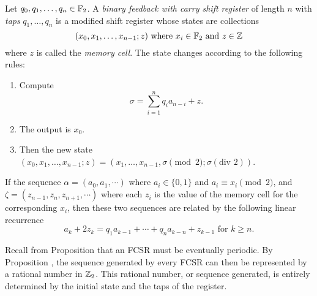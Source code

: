 \begin{definition}\label{def:fcsr}
  Let $q_0,q_1,\dots,q_n\in\mathbb{F}_2$. A {\em binary feedback with carry shift register} 
  of length $n$ with {\em taps} $q_1,\dots,q_n$ is a modified shift register
  whose states are collections
  \[
	(x_0,x_1,\dots,x_{n-1};z) \text{ where } x_i\in\mathbb{F}_2 \text{ and } z \in \mathbb{Z}
  \]
  where $z$ is called the {\it memory cell}. The state changes according
  to the following rules:
  \begin{enumerate}[1.]
    \item Compute
      \[
      \sigma = \sum^n_{i=1}q_ia_{n-i}+z.
      \]
    \item The output is $x_0$.
    \item Then the new state $(x_0,x_1,\dots,x_{n-1};z)
      =(x_1,\dots,x_{n-1},\sigma\pmod2;\sigma(\text{div }2))$.
  \end{enumerate}
\end{definition}

\begin{lemma}\label{lem:linear-recur}
\par If the sequence $\alpha=(a_0,a_1,\cdots)$ where $a_i\in\{0,1\}$ and
$a_i\equiv x_i\pmod2$, and $\zeta=(z_{n-1},z_n,z_{n+1},\cdots)$ where each
$z_i$ is the value of the memory cell for the corresponding $x_i$, then
these two sequences are related by the following linear recurrence
\begin{equation}\label{eqn:lin-rec}
  a_k+2z_k=q_1a_{k-1}+\cdots+q_na_{k-n}+z_{k-1} \text{ for } k\geq n.
\end{equation}
\end{lemma}

\par Recall from Proposition \label{prop:golomb-2} that an FCSR must be
eventually periodic. By Proposition \label{prop:rational-periodic}, the sequence
generated by every FCSR can then be represented by a rational number in
$\mathbb{Z}_2$. This rational number, or sequence generated, is entirely determined by
the initial state and the taps of the register.

